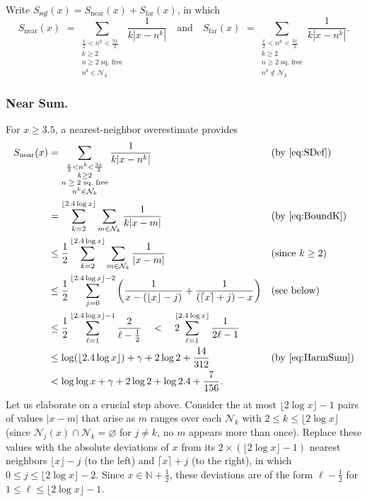 \documentclass[10pt,reqno]{amsart}
\theoremstyle{plain}
\theoremstyle{definition}
\newcommand{\N}{\mathbb{N}}
\newcommand{\NN}{\mathcal{N}}
\newcommand{\ceiling}[1]{\lceil #1 \rceil}
\newcommand{\floor}[1]{\lfloor #1 \rfloor}
\begin{document}
Write $S_{\mathrm{sqf}}(x) = S_{\text{near}}(x) + S_{\text{far}}(x)$, in which
\begin{equation}\label{eq:SDef}
    S_{\text{near}}(x)
    \,\,= \!\!\!\! \sum_{ \substack{ \frac{x}{2} < n^k < \frac{3x}{2} \\ k \geq 2 \\ \text{$n \geq 2$ sq.~free} \\ n^k \in \NN_k}}  \frac{1}{ k | x-n^k |}
    \quad \text{and} \quad
    S_{\text{far}}(x)
    \,\,= \!\!\!\! \sum_{ \substack{ \frac{x}{2} < n^k < \frac{3x}{2} \\ k \geq 2 \\ \text{$n \geq 2$ sq.~free} \\ n^k \notin \NN_k}}  \frac{1}{ k | x-n^k |}.
    \end{equation}

\subsubsection{Near Sum.}  
For $x\geq 3.5$, a nearest-neighbor overestimate provides
\begin{align}
    S_{\text{near}}(x)
    &= \sum_{ \substack{ \frac{x}{2} < n^k < \frac{3x}{2} \\ k \geq 2 \\ \text{$n \geq 2$ sq.~free} \\ n^k \in \NN_k}}  \frac{1}{ k | x-n^k |}  && (\text{by \eqref{eq:SDef}}) \nonumber\\
    &= \sum_{k=2}^{\floor{ 2.4\log x} } \sum_{  m \in \NN_k }   \frac{1}{ k | x-m |}  &&  (\text{by \eqref{eq:BoundK}}) \nonumber\\
    &\leq \frac{1}{2} \sum_{k=2}^{\floor{ 2.4\log x} }  \sum_{  m \in \NN_k }   \frac{1}{  | x-m |}  && ( \text{since $k \geq 2$} ) \nonumber\\
    &\leq \frac{1}{2} \sum_{j=0}^{\floor{ 2.4\log x}-2 }   \left( \frac{1}{  x - (\floor{x}-j)}  + \frac{1}{ (\ceiling{x} +j) - x} \right)  && (\text{see below}) \nonumber\\
    &\leq \frac{1}{2} \sum_{\ell=1}^{\floor{ 2.4\log x}-1 }  \frac{2}{\ell - \frac{1}{2}} 
    \quad<\quad 2 \!\!\!\!\sum_{\ell=1}^{\floor{ 2.4\log x} }  \frac{1}{2\ell - 1}  \nonumber\\
    &\leq \log( \floor{2.4\log x}) + \gamma + 2\log 2 + \frac{14}{312}&& ( \text{by \eqref{eq:HarmSum}}) \nonumber\\
    &< \log \log x  + \gamma + 2\log 2  + \log 2.4 +  \frac{7}{156} . \label{eq:Near}
\end{align}
Let us elaborate on a crucial step above.  Consider the at most $\floor{2 \log x} - 1$ pairs of values $|x-m|$ that arise
as $m$ ranges over each $\NN_k$ with $2 \leq k \leq \floor{2 \log x}$ (since $\NN_j(x) \cap \NN_k = \varnothing$ for $j \neq k$, no $m$ appears more than once).  
Replace these values with the absolute deviations of $x$ from its 
$2 \times (\floor{2 \log x} - 1)$ nearest neighbors
$\floor{x}-j$ (to the left) and $\ceiling{x}+j$ (to the right), in which $0 \leq j \leq \floor{2 \log x}-2$.
Since $x \in \N+\frac{1}{2}$, these
deviations are of the form $\ell - \frac{1}{2}$ for $1 \leq \ell \leq \floor{2\log x}-1$.
\end{document}
